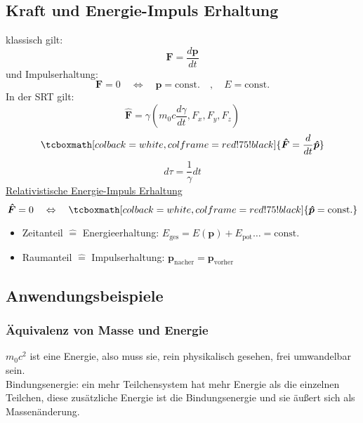 \documentclass[titlepage,11pt,a4paper,ngerman]{report}
\newcommand{\tx}[1]{\textrm{#1}}
\newcommand{\const}{\tx{const.}}
\renewcommand{\vec}[1]{\boldsymbol{#1}}
\newcommand{\lcom}[1]{\color{MidnightBlue}#1\color{black}}
\newcommand{\rmbox}[1]{\tcboxmath[colback=white,colframe=red!75!black]{#1}}
\begin{document}

\subsection{Kraft und Energie-Impuls Erhaltung}
klassisch gilt:
\begin{equation*}
\vec{F} = \frac{d\vec{p}}{dt}
\end{equation*}
und Impulserhaltung:
\begin{equation*}
\vec{F} = 0 \quad \Leftrightarrow \quad \vec{p} = \const \quad , \quad E = \const
\end{equation*}
In der SRT gilt:
\begin{equation*}
\vec{\hat F} = \gamma (m_0 c \frac{d\gamma}{dt}, F_x, F_y, F_z)
\end{equation*}
\begin{equation*}
\rmbox{\vec{\hat F} = \frac{d}{dt} \vec{\hat{p}}}
\end{equation*}
\begin{equation*}
d \tau = \frac{1}{\gamma} dt
\end{equation*}
\underline{Relativistische Energie-Impuls Erhaltung}
\begin{equation*}
\vec{\hat{F}} = 0 \quad \Leftrightarrow \quad \rmbox{\vec{\hat{p}} = \const}
\end{equation*}
\begin{itemize}
	\item Zeitanteil $ \widehat{=} $ Energieerhaltung: $ E_{\tx{ges}} = E(\vec{p}) + E_{\tx{pot}} \dots = \const $
	\item Raumanteil $ \widehat{=} $ Impulserhaltung: $ \vec{p}_{\tx{nacher}} = \vec{p}_{\tx{vorher}} $
\end{itemize}

\subsection{Anwendungsbeispiele}
\subsubsection{Äquivalenz von Masse und Energie}
\lcom{$m_0 c^2$ ist eine Energie, also muss sie, rein physikalisch gesehen, frei umwandelbar sein.}\\

\lcom{Bindungsenergie: ein mehr Teilchensystem hat mehr Energie als die einzelnen Teilchen, diese zusätzliche Energie ist die Bindungsenergie und sie äußert sich als Massenänderung.}
\end{document}
